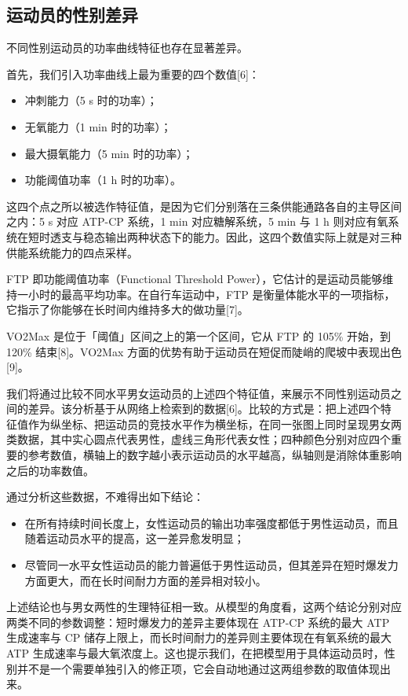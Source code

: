 \documentclass[11pt,a4paper]{ctexart}
\begin{document}
\subsection{运动员的性别差异}

不同性别运动员的功率曲线特征也存在显著差异。

首先，我们引入功率曲线上最为重要的四个数值[6]：
\begin{itemize}
\item 冲刺能力（5 s 时的功率）；
\item 无氧能力（1 min 时的功率）；
\item 最大摄氧能力（5 min 时的功率）；
\item 功能阈值功率（1 h 时的功率）。
\end{itemize}

这四个点之所以被选作特征值，是因为它们分别落在三条供能通路各自的主导区间之内：5 s 对应 ATP-CP 系统，1 min 对应糖解系统，5 min 与 1 h 则对应有氧系统在短时透支与稳态输出两种状态下的能力。因此，这四个数值实际上就是对三种供能系统能力的四点采样。

FTP 即功能阈值功率（Functional Threshold Power），它估计的是运动员能够维持一小时的最高平均功率。在自行车运动中，FTP 是衡量体能水平的一项指标，它指示了你能够在长时间内维持多大的做功量[7]。

VO2Max 是位于「阈值」区间之上的第一个区间，它从 FTP 的 105\% 开始，到 120\% 结束[8]。VO2Max 方面的优势有助于运动员在短促而陡峭的爬坡中表现出色[9]。

我们将通过比较不同水平男女运动员的上述四个特征值，来展示不同性别运动员之间的差异。该分析基于从网络上检索到的数据[6]。比较的方式是：把上述四个特征值作为纵坐标、把运动员的竞技水平作为横坐标，在同一张图上同时呈现男女两类数据，其中实心圆点代表男性，虚线三角形代表女性；四种颜色分别对应四个重要的参考数值，横轴上的数字越小表示运动员的水平越高，纵轴则是消除体重影响之后的功率数值。

通过分析这些数据，不难得出如下结论：
\begin{itemize}
\item 在所有持续时间长度上，女性运动员的输出功率强度都低于男性运动员，而且随着运动员水平的提高，这一差异愈发明显；
\item 尽管同一水平女性运动员的能力普遍低于男性运动员，但其差异在短时爆发力方面更大，而在长时间耐力方面的差异相对较小。
\end{itemize}

上述结论也与男女两性的生理特征相一致。从模型的角度看，这两个结论分别对应两类不同的参数调整：短时爆发力的差异主要体现在 ATP-CP 系统的最大 ATP 生成速率与 CP 储存上限上，而长时间耐力的差异则主要体现在有氧系统的最大 ATP 生成速率与最大氧浓度上。这也提示我们，在把模型用于具体运动员时，性别并不是一个需要单独引入的修正项，它会自动地通过这两组参数的取值体现出来。
\end{document}

